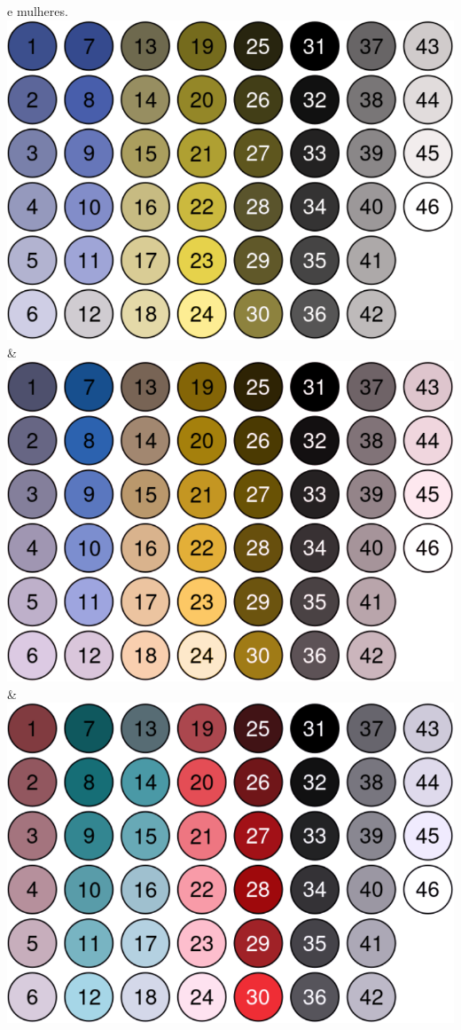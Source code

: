 \documentclass[
]{article}
\begin{document}
\begin{longtable}[]
e mulheres. \normalsize \\
\includegraphics{./friendlycolor_protanopia.png} &
\includegraphics{./friendlycolor_deuteranopia.png} &
\includegraphics{./friendlycolor_tritanopia.png} \\
\bottomrule
\end{longtable}
\end{document}
